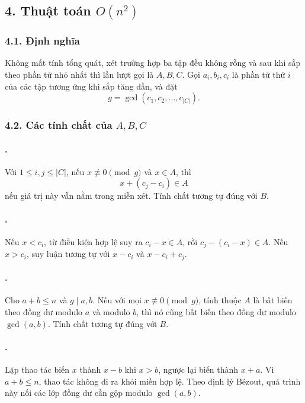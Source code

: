 \documentclass[11pt]{article}
\begin{document}
\subsection*{4. Thuật toán \(O(n^2)\)}

\subsubsection*{4.1. Định nghĩa}

Không mất tính tổng quát, xét trường hợp ba tập đều không rỗng và sau khi sắp
theo phần tử nhỏ nhất thì lần lượt gọi là \(A,B,C\). Gọi \(a_i,b_i,c_i\) là
phần tử thứ \(i\) của các tập tương ứng khi sắp tăng dần, và đặt
\[
  g=\gcd(c_1,c_2,\ldots,c_{|C|}).
\]

\subsubsection*{4.2. Các tính chất của \(A,B,C\)}

\paragraph{.}
Với \(1\le i,j\le |C|\), nếu \(x\not\equiv 0\pmod g\) và \(x\in A\), thì
\[
  x+(c_j-c_i)\in A
\]
nếu giá trị này vẫn nằm trong miền xét. Tính chất tương tự đúng với \(B\).

\paragraph{.}
Nếu \(x<c_i\), từ điều kiện hợp lệ suy ra \(c_i-x\in A\), rồi
\(c_j-(c_i-x)\in A\). Nếu \(x>c_i\), suy luận tương tự với \(x-c_i\) và
\(x-c_i+c_j\).

\paragraph{.}
Cho \(a+b\le n\) và \(g\mid a,b\). Nếu với mọi \(x\not\equiv 0\pmod g\),
tính thuộc \(A\) là bất biến theo đồng dư modulo \(a\) và modulo \(b\), thì nó
cũng bất biến theo đồng dư modulo \(\gcd(a,b)\). Tính chất tương tự đúng với
\(B\).

\paragraph{.}
Lặp thao tác biến \(x\) thành \(x-b\) khi \(x>b\), ngược lại biến thành
\(x+a\). Vì \(a+b\le n\), thao tác không đi ra khỏi miền hợp lệ. Theo định lý
Bézout, quá trình này nối các lớp đồng dư cần gộp modulo \(\gcd(a,b)\).
\end{document}
